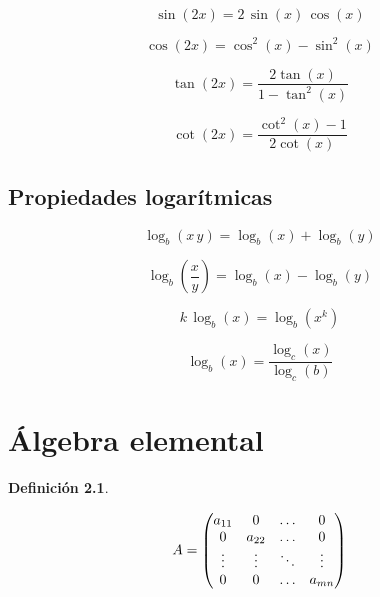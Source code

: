 \documentclass[a5paper,12pt,twoside]{book}
\newtheorem{defn}{{Definición}}[chapter]
\begin{document}
\begin{equation*}
    \sin{(2x)}=2 \, \sin{(x)} \, \cos{(x)}
\end{equation*}

\begin{equation*}
    \cos{(2x)}=\cos^2{(x)}-\sin^2{(x)}
\end{equation*}

\begin{equation*}
    \tan{(2x)}=\dfrac{2\tan{(x)}}{1-\tan^2{(x)}}
\end{equation*}

\begin{equation*}
    \cot{(2x)}=\dfrac{\cot^2{(x)}-1}{2\cot{(x)}}
\end{equation*}


\section{Propiedades logarítmicas}

\begin{equation*}
    \log_b{(x \, y)} = \log_b{(x)} + \log_b{(y)}
\end{equation*}

\begin{equation*}
    \log_b{\left( \frac{x}{y} \right)} = \log_b{(x)} - \log_b{(y)}
\end{equation*}

\begin{equation*}
    k \, \log_b{(x)} = \log_b{\left( x^k \right)}
\end{equation*}

\begin{equation*}
    \log_b{(x)}=\frac{\log_c{(x)}}{\log_c{(b)}}
\end{equation*}


\chapter{Álgebra elemental}

\begin{mdframed}[style=DefinitionFrame]
    \begin{defn}
    \end{defn}
    \begin{equation*}
        A =
        \begin{pmatrix}
            a_{11} & 0 & \dots & 0
            \\
            0 & a_{22} & \dots & 0
            \\
            \vdots & \vdots & \ddots & \vdots
            \\
            0 & 0 & \dots & a_{mn}
        \end{pmatrix}
    \end{equation*}
\end{mdframed}
\end{document}
